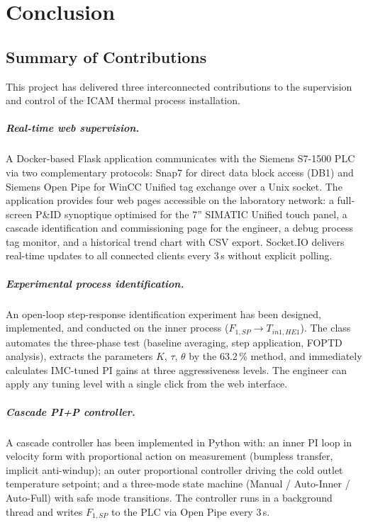 \chapter{Conclusion}

\section{Summary of Contributions}

This project has delivered three interconnected contributions to the supervision and control
of the ICAM thermal process installation.

\paragraph{Real-time web supervision.}
A Docker-based Flask application communicates with the Siemens S7-1500 PLC via two
complementary protocols: Snap7 for direct data block access (DB1) and Siemens Open Pipe for
WinCC Unified tag exchange over a Unix socket. The application provides four web pages
accessible on the laboratory network: a full-screen P\&ID synoptique optimised for the
7\textquotedblright{} SIMATIC Unified touch panel, a cascade identification and commissioning
page for the engineer, a debug process tag monitor, and a historical trend chart with CSV
export. Socket.IO delivers real-time updates to all connected clients every 3\,s without
explicit polling.

\paragraph{Experimental process identification.}
An open-loop step-response identification experiment has been designed, implemented, and
conducted on the inner process ($F_{1,SP} \rightarrow T_{in1,HE1}$). The 
class automates the three-phase test (baseline averaging, step application, FOPTD analysis),
extracts the parameters $K$, $\tau$, $\theta$ by the 63.2\,\% method, and immediately
calculates IMC-tuned PI gains at three aggressiveness levels. The engineer can apply any
tuning level with a single click from the web interface.

\paragraph{Cascade PI+P controller.}
A cascade controller has been implemented in Python with: an inner PI loop in velocity
form with proportional action on measurement (bumpless transfer, implicit anti-windup);
an outer proportional controller driving the cold outlet temperature setpoint; and a
three-mode state machine (Manual / Auto-Inner / Auto-Full) with safe mode transitions.
The controller runs in a background thread and writes $F_{1,SP}$ to the PLC via Open Pipe
every 3\,s.

